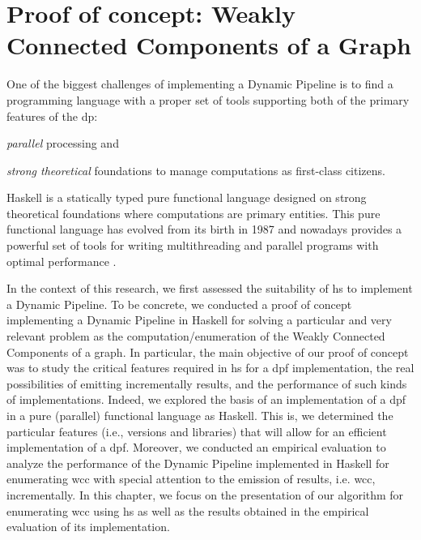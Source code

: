 \section{Proof of concept: Weakly Connected Components of a Graph}\label{prole}

One of the biggest challenges of implementing a Dynamic Pipeline is to find  a programming language with a proper set of tools supporting both of the  primary features of the \acrshort{dp}: \begin{inparaenum}[i\upshape)]
\item  \emph{parallel} processing and 
\item  \emph{strong theoretical} foundations to manage computations as first-class citizens.
 \end{inparaenum}
Haskell is a statically typed pure functional language designed on strong theoretical foundations where computations are primary entities.
This pure functional language has evolved from its birth in 1987 and nowadays provides a powerful set of tools for writing multithreading and parallel programs with optimal performance \cite{parallelbook, monadpar}. 

In the context of this research, we first assessed the suitability of \acrlong{hs}  to implement a Dynamic Pipeline. 
To be concrete, we conducted a proof of concept implementing a Dynamic Pipeline in  Haskell for solving a particular and very relevant problem as the computation/enumeration of the Weakly Connected Components of a graph.
In particular, the main objective of our proof of concept was to study the critical features required in \acrshort{hs} for a \acrshort{dpf} implementation,  the real possibilities of emitting incrementally results, and the performance of such kinds of implementations. 
Indeed, we explored the basis of an implementation of a \acrshort{dpf}  in a pure (parallel) functional language as Haskell.
This is, we determined the particular features (i.e., versions and libraries) that will allow for an efficient implementation of a \acrshort{dpf}. 
Moreover, we conducted an empirical evaluation to analyze the performance of the Dynamic Pipeline implemented in Haskell for enumerating \acrshort{wcc} with special attention to the emission of results, i.e. \acrshort{wcc}, incrementally. 
In this chapter, we focus on the presentation of our algorithm for enumerating \acrshort{wcc} using \acrshort{hs} as well as the results obtained in the empirical evaluation of its implementation. 
 
